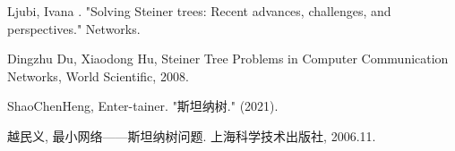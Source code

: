 \documentclass{SCIS2022cn}
\begin{document}


\newpage

\begin{thebibliography}{99}

     Ljubi, Ivana . "Solving Steiner trees: Recent advances, challenges, and perspectives." Networks. 

     Dingzhu Du, Xiaodong Hu, Steiner Tree Problems in Computer Communication Networks, World Scientific, 2008.

     ShaoChenHeng, Enter-tainer. "斯坦纳树." (2021). 

     越民义, 最小网络——斯坦纳树问题. 上海科学技术出版社, 2006.11.

\end{thebibliography}

\end{document}
